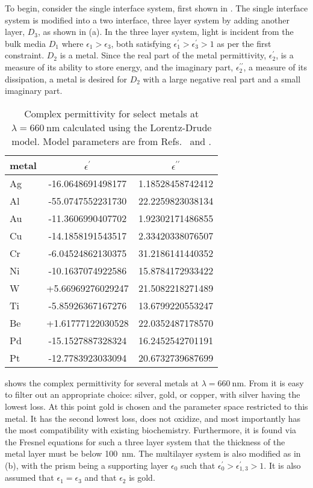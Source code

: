 To begin, consider the single interface system, first shown in
.  The single interface system is modified
into a two interface, three layer system by adding another layer, $D_3$, as
shown in (a).  In the three layer system,
light is incident from the bulk media $D_1$ where $\epsilon_1>\epsilon_3$,
both satisfying $\epsilon^\prime_1>\epsilon^\prime_3>1$ as per the first
constraint.  $D_2$ is a metal.  Since the real part of the metal
permittivity, $\epsilon_2^\prime$, is a measure of its ability to store
energy, and the imaginary part, $\epsilon_2^{\prime\prime}$, a measure of
its dissipation, a metal is desired for $D_2$ with a large negative real
part and a small imaginary part.  
\begin{table}[ht]
\centering
{}
\begin{tabular}{lSS}
\toprule
metal & {$\epsilon^\prime$} & {$\epsilon^{\prime\prime}$} \\
\midrule
Ag & -16.0648691498177 & 1.18528458742412\\
Al & -55.0747552231730 & 22.2259823038134\\
Au & -11.3606990407702 & 1.92302171486855\\
Cu & -14.1858191543517 & 2.33420338076507\\
Cr & -6.04524862130375 & 31.2186141440352\\
Ni & -10.1637074922586 & 15.8784172933422\\
W  & +5.66969276029247 & 21.5082218271489\\
Ti & -5.85926367167276 & 13.6799220553247\\
Be & +1.61777122030528 & 22.0352487178570\\
Pd & -15.1527887328324 & 16.2452542701191\\
Pt & -12.7783923033094 & 20.6732739687699\\
\bottomrule
\end{tabular}
\caption{Complex permittivity for select metals at
$\lambda=\SI{660}{\nano\meter}$ calculated using the Lorentz-Drude
model.  Model parameters are from Refs.~\cite{ung2007interference} and
\cite{rakic1998optical}.}
	\label{tbl:epsmetal600}
\end{table}

 shows the complex permittivity for several metals
at $\lambda=\SI{660}{\nano\meter}$.  From  it is
easy to filter out an appropriate choice: silver, gold, or copper, with
silver having the lowest loss.  At this point gold is chosen and the
parameter space restricted to this metal.  It has the second lowest loss,
does not oxidize, and most importantly has the most compatibility with
existing biochemistry.  Furthermore, it is found via the Fresnel equations
for such a three layer system that the thickness of the metal layer must be
below \SI{100}{\nano\meter}.  The multilayer system is also modified as in
(b), with the prism being a supporting layer
$\epsilon_0$ such that $\epsilon^\prime_0>\epsilon^\prime_{1,3}>1$.  It is
also assumed that $\epsilon_1=\epsilon_3$ and that $\epsilon_2$ is gold.

